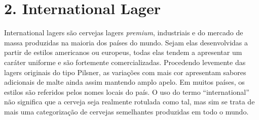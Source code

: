 \section*{2. International Lager}

International lagers são cervejas lagers \textit{premium}, industriais e do mercado de massa produzidas na maioria dos países do mundo. Sejam elas desenvolvidas a partir de estilos americanos ou europeus, todas elas tendem a apresentar um caráter uniforme e são fortemente comercializadas. Procedendo levemente das lagers originais do tipo Pilsner, as variações com mais cor apresentam sabores adicionais de malte ainda assim mantendo amplo apelo. Em muitos países, os estilos são referidos pelos nomes locais do país. O uso do termo “international” não significa que a cerveja seja realmente rotulada como tal, mas sim se trata de mais uma categorização de cervejas semelhantes produzidas em todo o mundo.
